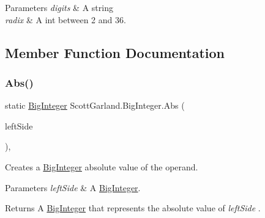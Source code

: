 \begin{DoxyParams}{Parameters}
{\em digits} & A string\\
\hline
{\em radix} & A int between 2 and 36.\\
\hline
\end{DoxyParams}


\subsection{Member Function Documentation}
\mbox{\label{class_scott_garland_1_1_big_integer_a885dbd49d878ba22013da4efda83545a}} 
\subsubsection{\texorpdfstring{Abs()}{Abs()}}
{\footnotesize\ttfamily static \hyperlink{class_scott_garland_1_1_big_integer}{Big\+Integer} Scott\+Garland.\+Big\+Integer.\+Abs (\begin{DoxyParamCaption}\item[{\hyperlink{class_scott_garland_1_1_big_integer}{Big\+Integer}}]{left\+Side }\end{DoxyParamCaption})\hspace{0.3cm}{\ttfamily [inline]}, {\ttfamily [static]}}



Creates a \hyperlink{class_scott_garland_1_1_big_integer}{Big\+Integer} absolute value of the operand. 


\begin{DoxyParams}{Parameters}
{\em left\+Side} & A \hyperlink{class_scott_garland_1_1_big_integer}{Big\+Integer}.\\
\hline
\end{DoxyParams}
\begin{DoxyReturn}{Returns}
A \hyperlink{class_scott_garland_1_1_big_integer}{Big\+Integer} that represents the absolute value of {\itshape left\+Side} .
\end{DoxyReturn}
\mbox{\label{class_scott_garland_1_1_big_integer_ac2c1dce674b509a0602a4bd8e3fa0e7f}} 
